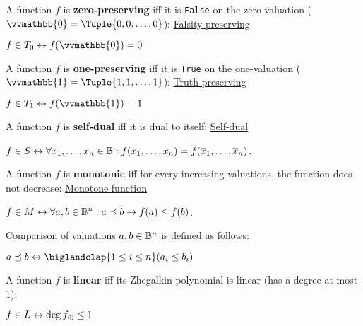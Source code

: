 \documentclass[a4paper,10pt]{article}
\begin{document}
\begin{terms}
    \item A function $f$ is \textbf{zero-preserving} iff it is \texttt{False} on the zero-valuation ($\vvmathbb{0} = \Tuple{0,0,\dotsc,0}$):
    \hfill\href{https://en.wikipedia.org/wiki/Functional_completeness#Characterization_of_functional_completeness}{Falsity-preserving}
    \par\quad$f \in T_0 \iff f(\vvmathbb{0}) = 0$

    \item A function $f$ is \textbf{one-preserving} iff it is \texttt{True} on the one-valuation ($\vvmathbb{1} = \Tuple{1,1,\dotsc,1}$):
    \hfill\href{https://en.wikipedia.org/wiki/Functional_completeness#Characterization_of_functional_completeness}{Truth-preserving}
    \par\quad$f \in T_1 \iff f(\vvmathbb{1}) = 1$

    \item A function $f$ is \textbf{self-dual} iff it is dual to itself:
    \hfill\href{https://en.wikipedia.org/wiki/Functional_completeness#Characterization_of_functional_completeness}{Self-dual}
    \par\quad$f \in S \mathrel{\leftrightarrow} \forall x_1,\dotsc,x_n \in \mathbb{B} : f(x_1, \dotsc, x_n) = \overline{f}(\overline{x}_1, \dotsc, \overline{x}_n)$.

    \item A function $f$ is \textbf{monotonic} iff for every increasing valuations, the function does not decrease:
    \hfill\href{https://en.wikipedia.org/wiki/Monotone_boolean_function}{Monotone function}
    \par\quad$f \in M \mathrel{\leftrightarrow} \forall a,b \in \mathbb{B}^n: a \preceq b \mathrel{\rightarrow} f(a) \leq f(b)$.

    Comparison of valuations $a,b \in \mathbb{B}^n$ is defined as follows:
    \par\quad$\displaystyle a \preceq b \iff \biglandclap{1 \leq i \leq n} (a_i \leq b_i)$

    \item A function $f$ is \textbf{linear} iff its Zhegalkin polynomial is linear (\ie has a degree at most 1):
    \par\quad$f \in L \mathrel{\leftrightarrow} \operatorname{deg} f_{\oplus} \leq 1$
\end{terms}


\end{document}
